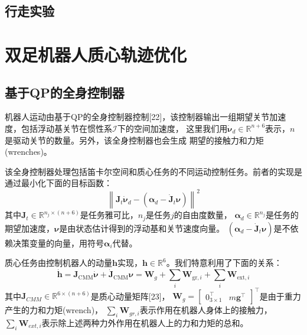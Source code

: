 \section{行走实验}

\chapter{双足机器人质心轨迹优化}
\section{基于QP的全身控制器}
机器人运动由基于QP的全身控制器控制[22]，该控制器输出一组期望关节加速度，包括浮动基关节在惯性系$\mathcal{I}$下的空间加速度，
这里我们用$\dot{\boldsymbol{\nu}}_d \in \mathbb{R}^{n+6}$表示，$n$是驱动关节的数量。另外，该全身控制器也会生成
期望的接触力和力矩(wrenches)。

该全身控制器处理包括笛卡尔空间和质心任务的不同运动控制任务。前者的实现是通过最小化下面的目标函数：
\begin{equation}
    \label{equ:qp_objective}
    \left\|\boldsymbol{J}_t \dot{\boldsymbol{\nu}}_d-\left(\boldsymbol{\alpha}_d-\dot{\boldsymbol{J}}_t \boldsymbol{\nu}\right)\right\|^2
\end{equation}
其中$\boldsymbol{J}_t \in \mathbb{R}^{n_j \times (n+6)}$是任务雅可比，$n_j$是任务$j$的自由度数量，
$\boldsymbol{\alpha}_d \in \mathbb{R}^{n_j}$是任务的期望加速度，$\boldsymbol{\nu}$是由状态估计得到的浮动基和关节速度向量。
$\left(\boldsymbol{\alpha}_d-\dot{\boldsymbol{J}}_t \boldsymbol{\nu}\right)$是不依赖决策变量的向量，用符号$\boldsymbol{\alpha}_i$代替。

质心任务由控制机器人的动量$\boldsymbol{h}$实现，$\boldsymbol{h} \in \mathbb{R}^{6}$。我们特意利用了下面的关系：
\begin{equation}
    \label{equ:qp_momentum}
    \dot{\boldsymbol{h}}=\boldsymbol{J}_{\mathrm{CMM}} \dot{\boldsymbol{\nu}}+\dot{\boldsymbol{J}}_{\mathrm{CMM}} \boldsymbol{\nu}=\boldsymbol{W}_g+\sum_i \boldsymbol{W}_{\mathrm{gr}, i}+\sum_i \boldsymbol{W}_{\mathrm{ext}, i}
\end{equation}
其中$\boldsymbol{J}_{CMM} \in \mathbb{R}^{6 \times (n+6)}$是质心动量矩阵[23]，
$\boldsymbol{W}_g=\left[\begin{array}{ll}0_{3 \times 1}^{\top} & m \boldsymbol{g}^{\top}\end{array}\right]^{\top}$是由于重力产生的力和力矩(wrench)，
$\sum_i {\boldsymbol{W}_{gr,i}}$表示作用在机器人身体上的接触力，$\sum_i {\boldsymbol{W}_{ext,i}}$表示除上述两种力外作用在机器人上的力和力矩的总和。

